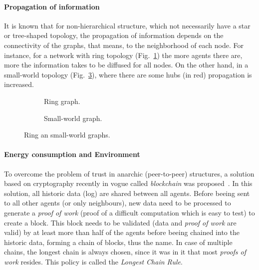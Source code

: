 \documentclass[../main.tex]{subfiles}
\begin{document}
\paragraph{Propagation of information}
It is known that for non-hierarchical structure, which not necessarily have a star or tree-shaped topology, the propagation of information depends on the connectivity of the graphs, that means, to the neighborhood of each node.
For instance, for a network with ring topology (Fig.~\ref{fig:ring_topology}) the more agents there are, more the information takes to be diffused for all nodes.
On the other hand, in a small-world topology (Fig.~\ref{fig:smallworld_topology}), where there are some hubs (in red) propagation is increased.

\begin{figure}[h]
  \begin{subfigure}[t]{.45\textwidth}
    \centering
    \caption{Ring graph.}\label{fig:ring_topology}
  \end{subfigure}
  \hfill
  \begin{subfigure}[t]{.45\textwidth}
    \centering
    \caption{Small-world graph.}\label{fig:smallworld_topology}
  \end{subfigure}
  \caption{Ring an small-world graphs.}
\end{figure}

\paragraph{Energy consumption and Environment}
To overcome the problem of trust in anarchic (peer-to-peer) structures, a solution based on cryptography recently in vogue called \emph{blockchain} was proposed~\cite{Nakamoto2008}.
In this solution, all historic data (log) are shared between all agents.
Before beeing sent to all other agents (or only neighbours), new data need to be processed to generate a \emph{proof of work} (proof of a difficult computation which is easy to test) to create a block.
This block needs to be validated (data and \emph{proof of work} are valid) by at least more than half of the agents before beeing chained into the historic data, forming a chain of blocks, thus the name.
In case of multiple chains, the longest chain is always chosen, since it was in it that most \emph{proofs of work} resides. This policy is called the \emph{Longest Chain Rule}.
\end{document}
